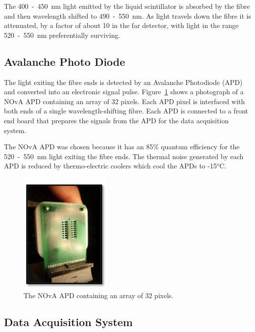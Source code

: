 The 400~-~450~nm light emitted by the liquid scintillator is absorbed
by the fibre and then wavelength shifted to 490~-~550~nm. 
As light travels down the fibre it is attenuated, by a factor of about
10 in the far detector, with light in the range 520~-~550~nm
preferentially surviving. 


\subsection{Avalanche Photo Diode}

The light exiting the fibre ends is detected by an Avalanche
Photodiode (APD) and converted into an
electronic signal pulse. 
Figure~\ref{fig:apd} shows a photograph of a NOvA APD
containing an array
of 32 pixels. Each APD pixel is interfaced with both ends of a single
wavelength-shifting fibre. Each APD is connected to a front end board
that prepares the signals from the APD for the data acquisition
system. 

The NOvA APD was chosen because it has an 85\% quantum efficiency for
the 520~-~550~nm light exiting the fibre ends. 
The thermal noise generated by each APD is reduced by thermo-electric
coolers which cool the APDs to -15$^o$C. 


\begin{figure}
  \centering
  \includegraphics[width=0.4\textwidth]{../../img/det/gen/APD.png}
  \caption{The NOvA APD containing an array of 32 pixels.}
  \label{fig:apd}
\end{figure}





\subsection{Data Acquisition System}\label{sec:DAQ}

